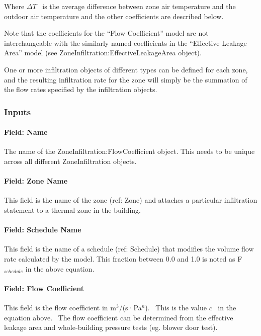 Where \(\Delta T\) ~is the average difference between zone air temperature and the outdoor air temperature and the other coefficients are described below.

Note that the coefficients for the ``Flow Coefficient'' model are not interchangeable with the similarly named coefficients in the ``Effective Leakage Area'' model (see ZoneInfiltration:EffectiveLeakageArea object).

One or more infiltration objects of different types can be defined for each zone, and the resulting infiltration rate for the zone will simply be the summation of the flow rates specified by the infiltration objects.

\subsubsection{Inputs}\label{inputs-2-005}

\paragraph{Field: Name}\label{field-name-2-004}

The name of the ZoneInfiltration:FlowCoefficient object. This needs to be unique across all different ZoneInfiltration objects.

\paragraph{Field: Zone Name}\label{field-zone-name-1-001}

This field is the name of the zone (ref: Zone) and attaches a particular infiltration statement to a thermal zone in the building.

\paragraph{Field: Schedule Name}\label{field-schedule-name-2}

This field is the name of a schedule (ref: Schedule) that modifies the volume flow rate calculated by the model. This fraction between 0.0 and 1.0 is noted as F\(_{schedule}\) in the above equation.

\paragraph{Field: Flow Coefficient}\label{field-flow-coefficient}

This field is the flow coefficient in m\(^{3}\)/(s·Pa\(^{n}\)).~ This is the value \(c\) ~in the equation above.~ The flow coefficient can be determined from the effective leakage area and whole-building pressure tests (eg. blower door test).

